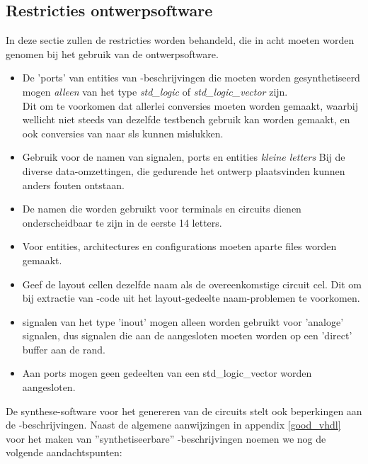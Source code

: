 \subsection{Restricties ontwerpsoftware}
In deze sectie zullen de restricties worden behandeld, die in acht
moeten worden genomen bij het gebruik van de ontwerpsoftware.
\begin{itemize}
\item De 'ports' van entities van -beschrijvingen die moeten worden
      gesynthetiseerd mogen {\it alleen} van het type {\it std\_logic} of
      {\it std\_logic\_vector} zijn.\\
      Dit om te voorkomen dat allerlei conversies moeten worden gemaakt,
      waarbij wellicht niet steeds van dezelfde testbench gebruik kan
      worden gemaakt, en ook conversies van  naar sls kunnen mislukken.
\item Gebruik voor de namen van signalen, ports en entities {\it kleine letters}
      Bij de diverse data-omzettingen, die gedurende het ontwerp plaatsvinden
      kunnen anders fouten ontstaan.
\item De namen die worden gebruikt voor terminals en
      circuits dienen onderscheidbaar te zijn in de eerste 14 letters.
\item Voor entities, architectures en configurations moeten aparte files
      worden gemaakt.
\item Geef de layout cellen dezelfde naam als de overeenkomstige circuit cel.
      Dit om bij extractie van
      -code uit het layout-gedeelte naam-problemen te voorkomen.
\item signalen van het type 'inout' mogen alleen worden gebruikt voor
      'analoge' signalen, dus signalen die aan de aangesloten moeten worden
      op een 'direct' buffer aan de rand.
\item Aan ports mogen geen gedeelten van een std\_logic\_vector worden
      aangesloten.
\end{itemize}
De synthese-software voor het genereren van de circuits stelt ook
beperkingen aan de -beschrijvingen.
Naast de algemene aanwijzingen in appendix \ref{good_vhdl} voor het maken van ''synthetiseerbare''
-beschrijvingen noemen we nog de volgende aandachtspunten:
